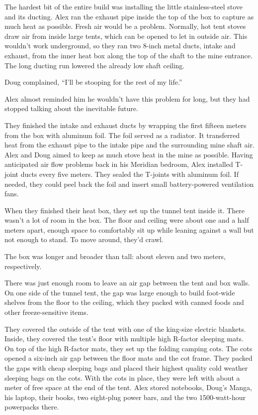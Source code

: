 The hardest bit of the entire build was installing the little
stainless-steel stove and its ducting. Alex ran the exhaust pipe inside
the top of the box to capture as much heat as possible. Fresh air would
be a problem. Normally, hot tent stoves draw air from inside large
tents, which can be opened to let in outside air. This wouldn't work
underground, so they ran two 8-inch metal ducts, intake and exhaust,
from the inner heat box along the top of the shaft to the mine entrance.
The long ducting run lowered the already low shaft ceiling.

Doug complained, ``I'll be stooping for the rest of my life.''

Alex almost reminded him he wouldn't have this problem for long, but
they had stopped talking about the inevitable future.

They finished the intake and exhaust ducts by wrapping the first fifteen
meters from the box with aluminum foil. The foil served as a radiator.
It transferred heat from the exhaust pipe to the intake pipe and the
surrounding mine shaft air. Alex and Doug aimed to keep as much stove
heat in the mine as possible. Having anticipated air flow problems back
in his Meridian bedroom, Alex installed T-joint ducts every five meters.
They sealed the T-joints with aluminum foil. If needed, they could peel
back the foil and insert small battery-powered ventilation fans.

When they finished their heat box, they set up the tunnel tent inside
it. There wasn't a lot of room in the box. The floor and ceiling were
about one and a half meters apart, enough space to comfortably sit up
while leaning against a wall but not enough to stand. To move around,
they'd crawl.

The box was longer and broader than tall: about eleven and two meters,
respectively.

There was just enough room to leave an air gap between the tent and box
walls. On one side of the tunnel tent, the gap was large enough to build
foot-wide shelves from the floor to the ceiling, which they packed with
canned foods and other freeze-sensitive items.

They covered the outside of the tent with one of the king-size electric
blankets. Inside, they covered the tent's floor with multiple high
R-factor sleeping mats. On top of the high R-factor mats, they set up
the folding camping cots. The cots opened a six-inch air gap between the
floor mats and the cot frame. They packed the gaps with cheap sleeping
bags and placed their highest quality cold weather sleeping bags on the
cots. With the cots in place, they were left with about a meter of free
space at the end of the tent. Alex stored notebooks, Doug's Manga, his
laptop, their books, two eight-plug power bars, and the two
1500-watt-hour powerpacks there.

